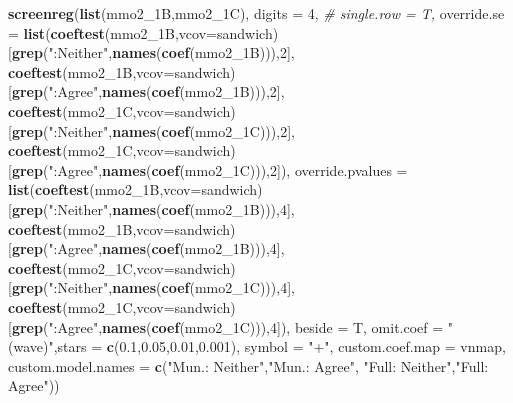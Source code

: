 \documentclass[
]{article}
\newenvironment{Shaded}{\begin{snugshade}}{\end{snugshade}}
\newcommand{\CommentTok}[1]{\textcolor[rgb]{0.56,0.35,0.01}{\textit{#1}}}
\newcommand{\DataTypeTok}[1]{\textcolor[rgb]{0.13,0.29,0.53}{#1}}
\newcommand{\DecValTok}[1]{\textcolor[rgb]{0.00,0.00,0.81}{#1}}
\newcommand{\FloatTok}[1]{\textcolor[rgb]{0.00,0.00,0.81}{#1}}
\newcommand{\KeywordTok}[1]{\textcolor[rgb]{0.13,0.29,0.53}{\textbf{#1}}}
\newcommand{\NormalTok}[1]{#1}
\newcommand{\StringTok}[1]{\textcolor[rgb]{0.31,0.60,0.02}{#1}}
\begin{document}
\begin{Shaded}
\begin{Highlighting}[]
\KeywordTok{screenreg}\NormalTok{(}\KeywordTok{list}\NormalTok{(mmo2_1B,mmo2_1C), }\DataTypeTok{digits =} \DecValTok{4}\NormalTok{, }\CommentTok{# single.row = T,}
          \DataTypeTok{override.se =} \KeywordTok{list}\NormalTok{(}\KeywordTok{coeftest}\NormalTok{(mmo2_1B,}\DataTypeTok{vcov=}\NormalTok{sandwich)[}\KeywordTok{grep}\NormalTok{(}\StringTok{":Neither"}\NormalTok{,}\KeywordTok{names}\NormalTok{(}\KeywordTok{coef}\NormalTok{(mmo2_1B))),}\DecValTok{2}\NormalTok{],}
                             \KeywordTok{coeftest}\NormalTok{(mmo2_1B,}\DataTypeTok{vcov=}\NormalTok{sandwich)[}\KeywordTok{grep}\NormalTok{(}\StringTok{":Agree"}\NormalTok{,}\KeywordTok{names}\NormalTok{(}\KeywordTok{coef}\NormalTok{(mmo2_1B))),}\DecValTok{2}\NormalTok{],}
                             \KeywordTok{coeftest}\NormalTok{(mmo2_1C,}\DataTypeTok{vcov=}\NormalTok{sandwich)[}\KeywordTok{grep}\NormalTok{(}\StringTok{":Neither"}\NormalTok{,}\KeywordTok{names}\NormalTok{(}\KeywordTok{coef}\NormalTok{(mmo2_1C))),}\DecValTok{2}\NormalTok{],}
                             \KeywordTok{coeftest}\NormalTok{(mmo2_1C,}\DataTypeTok{vcov=}\NormalTok{sandwich)[}\KeywordTok{grep}\NormalTok{(}\StringTok{":Agree"}\NormalTok{,}\KeywordTok{names}\NormalTok{(}\KeywordTok{coef}\NormalTok{(mmo2_1C))),}\DecValTok{2}\NormalTok{]),}
          \DataTypeTok{override.pvalues =} \KeywordTok{list}\NormalTok{(}\KeywordTok{coeftest}\NormalTok{(mmo2_1B,}\DataTypeTok{vcov=}\NormalTok{sandwich)[}\KeywordTok{grep}\NormalTok{(}\StringTok{":Neither"}\NormalTok{,}\KeywordTok{names}\NormalTok{(}\KeywordTok{coef}\NormalTok{(mmo2_1B))),}\DecValTok{4}\NormalTok{],}
                                  \KeywordTok{coeftest}\NormalTok{(mmo2_1B,}\DataTypeTok{vcov=}\NormalTok{sandwich)[}\KeywordTok{grep}\NormalTok{(}\StringTok{":Agree"}\NormalTok{,}\KeywordTok{names}\NormalTok{(}\KeywordTok{coef}\NormalTok{(mmo2_1B))),}\DecValTok{4}\NormalTok{],}
                                  \KeywordTok{coeftest}\NormalTok{(mmo2_1C,}\DataTypeTok{vcov=}\NormalTok{sandwich)[}\KeywordTok{grep}\NormalTok{(}\StringTok{":Neither"}\NormalTok{,}\KeywordTok{names}\NormalTok{(}\KeywordTok{coef}\NormalTok{(mmo2_1C))),}\DecValTok{4}\NormalTok{],}
                                  \KeywordTok{coeftest}\NormalTok{(mmo2_1C,}\DataTypeTok{vcov=}\NormalTok{sandwich)[}\KeywordTok{grep}\NormalTok{(}\StringTok{":Agree"}\NormalTok{,}\KeywordTok{names}\NormalTok{(}\KeywordTok{coef}\NormalTok{(mmo2_1C))),}\DecValTok{4}\NormalTok{]),}
          \DataTypeTok{beside =}\NormalTok{ T,}
          \DataTypeTok{omit.coef =} \StringTok{"(wave)"}\NormalTok{,}\DataTypeTok{stars =} \KeywordTok{c}\NormalTok{(}\FloatTok{0.1}\NormalTok{,}\FloatTok{0.05}\NormalTok{,}\FloatTok{0.01}\NormalTok{,}\FloatTok{0.001}\NormalTok{), }\DataTypeTok{symbol =} \StringTok{"+"}\NormalTok{,}
          \DataTypeTok{custom.coef.map =}\NormalTok{ vnmap,}
          \DataTypeTok{custom.model.names =} \KeywordTok{c}\NormalTok{(}\StringTok{"Mun.: Neither"}\NormalTok{,}\StringTok{"Mun.: Agree"}\NormalTok{,}
                                 \StringTok{"Full: Neither"}\NormalTok{,}\StringTok{"Full: Agree"}\NormalTok{))}
\end{Highlighting}
\end{Shaded}
\end{document}

